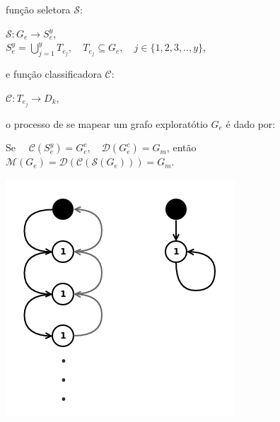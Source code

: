 função seletora $\mathcal{S}$:

\begin{center}
  $\mathcal{S}:G_e \rightarrow S_e^y$,
   \\
   \hfill \break
  $S_e^y = \bigcup\limits_{j=1}^y T_{e_j},
   \quad T_{e_j} \subseteq G_e,
   \quad j \in \{ 1, 2, 3, .., y \}$,
\end{center}

e função classificadora $\mathcal{C}$:

\begin{center}
  $\mathcal{C}:T_{e_j} \rightarrow D_k$,
\end{center}

o processo de se mapear um grafo exploratótio $G_e$ é dado por:

\begin{center}
  Se $\quad \mathcal{C}({S_e^y}) = {G_e^c},
      \quad \mathcal{D}({G_e^c}) = {G_m}$, então
      \\
      \hfill \break
     $\mathcal{M}({G_e}) = \mathcal{D}(\mathcal{C}(\mathcal{S}({G_e}))) = {G_m}$.
\end{center}

{
  \centering
  \captionsetup{type=figure}
	\includegraphics[scale=0.5]{./figures/Figure021-Recursion.png}
	\label{Figure021-Recursion}
}

